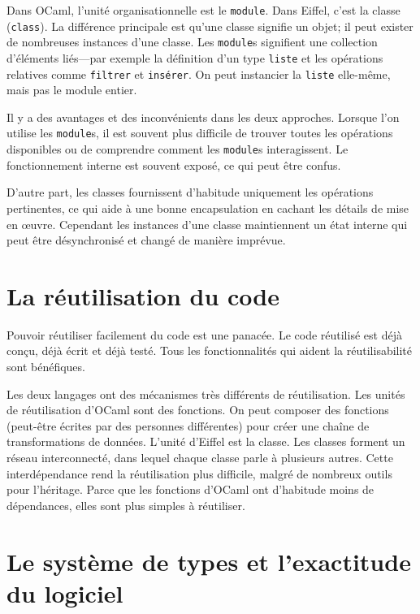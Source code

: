 \documentclass[french]{report}
\begin{document}
Dans OCaml, l'unité organisationnelle est le \texttt{module}. Dans Eiffel, c'est la classe (\texttt{class}). La différence principale est qu'une classe signifie un objet; il peut exister de nombreuses instances d'une classe. Les \texttt{module}s signifient une collection d'éléments liés---par exemple la définition d'un type \texttt{liste} et les opérations relatives comme \texttt{filtrer} et \texttt{insérer}. On peut instancier la \texttt{liste} elle-même, mais pas le module entier.

Il y a des avantages et des inconvénients dans les deux approches. Lorsque l'on utilise les \texttt{module}s, il est souvent plus difficile de trouver toutes les opérations disponibles ou de comprendre comment les \texttt{module}s interagissent. Le fonctionnement interne est souvent exposé, ce qui peut être confus.

D'autre part, les classes fournissent d'habitude uniquement les opérations pertinentes, ce qui aide à une bonne encapsulation en cachant les détails de mise en œuvre. Cependant les instances d'une classe maintiennent un état interne qui peut être désynchronisé et changé de manière imprévue.

\section{La réutilisation du code}

Pouvoir réutiliser facilement du code est une panacée. Le code réutilisé est déjà conçu, déjà écrit et déjà testé. Tous les fonctionnalités qui aident la réutilisabilité sont bénéfiques.

Les deux langages ont des mécanismes très différents de réutilisation. Les unités de réutilisation d'OCaml sont des \glspl{fonction}. On peut composer des \glspl{fonction} (peut-être écrites par des personnes différentes) pour créer une chaîne de transformations de données. L'unité d'Eiffel est la classe. Les classes forment un réseau interconnecté, dans lequel chaque classe parle à plusieurs autres. Cette interdépendance rend la réutilisation plus difficile, malgré de nombreux outils pour l'héritage. Parce que les \glspl{fonction} d'OCaml ont d'habitude moins de dépendances, elles sont plus simples à réutiliser.

\section{Le système de types et l'exactitude du logiciel}
\end{document}
